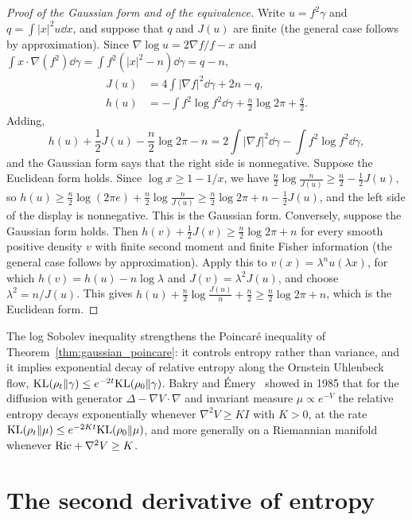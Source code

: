 \begin{proof}[Proof of the Gaussian form and of the equivalence]
Write $u = f^2\gamma$ and $q = \int|x|^2u\dd x$, and suppose that $q$ and $J(u)$ are finite (the general case follows by approximation). Since $\nabla\log u = 2\nabla f/f-x$ and $\int x\cdot\nabla(f^2)\dd\gamma = \int f^2(|x|^2-n)\dd\gamma = q-n$,
\[
\begin{aligned}J(u) &= 4\int|\nabla f|^2\dd\gamma+2n-q,\\ h(u) &= -\int f^2\log f^2\dd\gamma+\frac n2\log2\pi+\frac q2.\end{aligned}
\]
Adding,
\[
h(u)+\frac12J(u)-\frac n2\log2\pi-n = 2\int|\nabla f|^2\dd\gamma-\int f^2\log f^2\dd\gamma,
\]
and the Gaussian form says that the right side is nonnegative. Suppose the Euclidean form holds. Since $\log x\geq1-1/x$, we have $\frac n2\log\frac{n}{J(u)}\geq\frac n2-\frac12J(u)$, so $h(u)\geq\frac n2\log(2\pi e)+\frac n2\log\frac{n}{J(u)}\geq\frac n2\log2\pi+n-\frac12J(u)$, and the left side of the display is nonnegative. This is the Gaussian form. Conversely, suppose the Gaussian form holds. Then $h(v)+\frac12J(v)\geq\frac n2\log2\pi+n$ for every smooth positive density $v$ with finite second moment and finite Fisher information (the general case follows by approximation). Apply this to $v(x) = \lambda^nu(\lambda x)$, for which $h(v) = h(u)-n\log\lambda$ and $J(v) = \lambda^2J(u)$, and choose $\lambda^2 = n/J(u)$. This gives $h(u)+\frac n2\log\frac{J(u)}{n}+\frac n2\geq\frac n2\log2\pi+n$, which is the Euclidean form.
\end{proof}

The log Sobolev inequality strengthens the Poincar\'e inequality of Theorem~\ref{thm:gaussian_poincare}: it controls entropy rather than variance, and it implies exponential decay of relative entropy along the Ornstein Uhlenbeck flow, $\mathrm{KL}(\rho_t\|\gamma)\leq e^{-2t}\mathrm{KL}(\rho_0\|\gamma)$. Bakry and \'Emery~\cite{bakry1985} showed in 1985 that for the diffusion with generator $\Delta - \nabla V\cdot\nabla$ and invariant measure $\mu\propto e^{-V}$ the relative entropy decays exponentially whenever $\nabla^2V\geq K I$ with $K>0$, at the rate $\mathrm{KL}(\rho_t\|\mu)\leq e^{-2Kt}\mathrm{KL}(\rho_0\|\mu)$, and more generally on a Riemannian manifold whenever $\mathrm{Ric}+\nabla^2V\geq K$.

\section{The second derivative of entropy}

